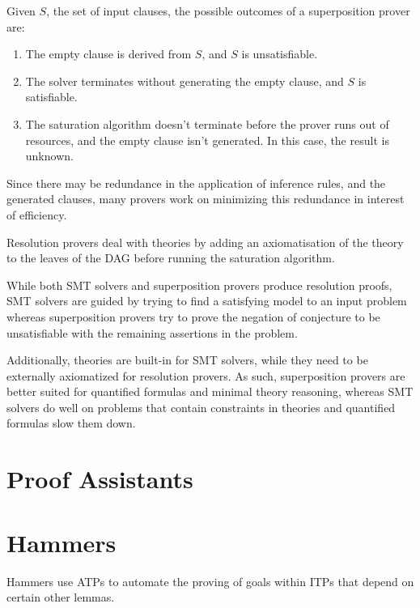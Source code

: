 \documentclass{article}
\begin{document}
	Given $S$, the set of input clauses, the possible 
	outcomes of a superposition prover are:
	\begin{enumerate}
		\item The empty clause is derived from $S$, and
		$S$ is unsatisfiable.
		\item The solver terminates without generating the 
		empty clause, and $S$ is satisfiable.
		\item The saturation algorithm doesn't terminate 
		before the prover runs out of resources, and 
		the empty clause isn't generated. In this 
		case, the result is unknown. 
	\end{enumerate}
	
	Since there may be redundance in the application 
	of inference rules, and the generated clauses, 
	many provers work on minimizing this redundance in 
	interest of efficiency.
	
	Resolution provers deal with theories by 
	adding an axiomatisation of the theory to the 
	leaves of the DAG before running the 
	saturation algorithm.
	
	While both SMT solvers and superposition provers 
	produce resolution proofs, SMT solvers are guided 
	by trying to find a satisfying model to an input 
	problem whereas superposition provers try 
	to prove the negation of conjecture to be unsatisfiable
	with the remaining assertions in the problem. 
	
	Additionally, theories are built-in for SMT solvers,
	while they need to be externally axiomatized for 
	resolution provers. As such, superposition provers
	are better suited for quantified formulas and 
	minimal theory reasoning, whereas SMT solvers 
	do well on problems that contain constraints 
	in theories and quantified formulas slow them 
	down.
	
\section{Proof Assistants}
\label{itp}
	
\section{Hammers}
\label{gen-hammers}
	Hammers use ATPs to automate the proving of goals within ITPs
	that depend on certain other lemmas. 
	
\end{document}
